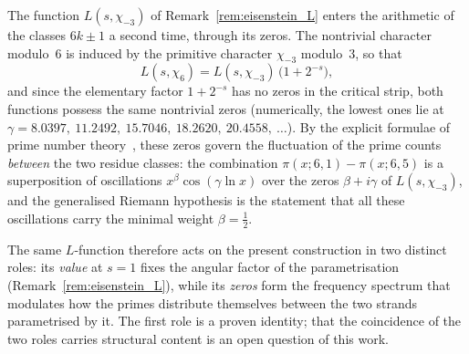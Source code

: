 
\begin{remark}
\label{rem:L_two_roles}
The function $L(s,\chi_{-3})$ of Remark~\ref{rem:eisenstein_L} enters
the arithmetic of the classes $6k \pm 1$ a second time, through its
zeros. The nontrivial character modulo~$6$ is induced by the primitive
character $\chi_{-3}$ modulo~$3$, so that
\begin{equation}
  L(s,\chi_6) = L(s,\chi_{-3})\,\bigl(1 + 2^{-s}\bigr),
\end{equation}
and since the elementary factor $1 + 2^{-s}$ has no zeros in the
critical strip, both functions possess the same nontrivial zeros
(numerically, the lowest ones lie at
$\gamma = 8.0397,\ 11.2492,\ 15.7046,\ 18.2620,\ 20.4558,\ \ldots$).
By the explicit formulae of prime number theory~\cite{Davenport2000},
these zeros govern the fluctuation of the prime counts \emph{between}
the two residue classes: the combination
$\pi(x; 6, 1) - \pi(x; 6, 5)$ is a superposition of oscillations
$x^{\beta}\cos(\gamma \ln x)$ over the zeros $\beta + i\gamma$ of
$L(s,\chi_{-3})$, and the generalised Riemann hypothesis is the
statement that all these oscillations carry the minimal weight
$\beta = \tfrac12$.

The same $L$-function therefore acts on the present construction in
two distinct roles: its \emph{value} at $s = 1$ fixes the angular
factor of the parametrisation
(Remark~\ref{rem:eisenstein_L}), while its \emph{zeros} form the
frequency spectrum that modulates how the primes distribute themselves
between the two strands parametrised by it. The first role is a proven
identity; that the coincidence of the two roles carries structural
content is an open question of this work.
\end{remark}


